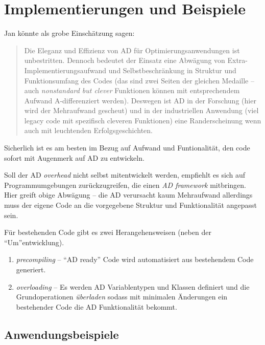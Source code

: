 \documentclass[
]{book}
\newenvironment {JHSAYS} [0] {\begin{quote}\color{jhsc}} {\end{quote}}
\theoremstyle{definition}
\theoremstyle{definition}
\theoremstyle{definition}
\theoremstyle{definition}
\theoremstyle{remark}
\begin{document}
\hypertarget{implementierungen-und-beispiele}{%
\section{Implementierungen und Beispiele}\label{implementierungen-und-beispiele}}

Jan könnte als grobe Einschätzung sagen:

\leavevmode{}%
\begin{JHSAYS}
Die Eleganz und Effizienz von AD für Optimierungsanwendungen ist
unbestritten. Dennoch bedeutet der Einsatz eine Abwägung von
Extra-Implementierungsaufwand und Selbstbeschränkung in Struktur und
Funktionsumfang des Codes (das sind zwei Seiten der gleichen Medaille -- auch
\emph{nonstandard but clever} Funktionen können mit entsprechendem Aufwand
A-differenziert werden).
Deswegen ist AD in der Forschung (hier wird der Mehraufwand gescheut) und in der
industriellen Anwendung (viel legacy code mit spezifisch cleveren Funktionen)
eine Randerscheinung wenn auch mit leuchtenden Erfolgsgeschichten.

\end{JHSAYS}

Sicherlich ist es am besten im Bezug auf Aufwand und Funtionalität, den
code sofort mit Augenmerk auf AD zu entwickeln.

Soll der AD \emph{overhead} nicht selbst mitentwickelt werden, empfiehlt es sich auf
Programmumgebungen zurückzugreifen, die einen \emph{AD framework} mitbringen.
Hier greift obige Abwägung -- die AD verursacht kaum Mehraufwand allerdings
muss der eigene Code an die vorgegebene Struktur und Funktionalität
angepasst sein.

Für bestehenden Code gibt es zwei Herangehensweisen (neben der
``Um''entwicklung).

\begin{enumerate}
\def\labelenumi{\arabic{enumi}.}
\item
  \emph{precompiling} -- ``AD ready'' Code wird automatisiert aus bestehendem Code
  generiert.
\item
  \emph{overloading} -- Es werden AD Variablentypen und Klassen definiert und die
  Grundoperationen \emph{überladen} sodass mit minimalen Änderungen ein
  bestehender Code die AD Funktionalität bekommt.
\end{enumerate}

\hypertarget{anwendungsbeispiele}{%
\subsection{Anwendungsbeispiele}\label{anwendungsbeispiele}}
\end{document}
